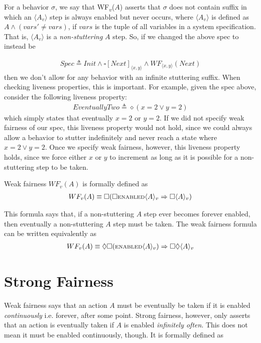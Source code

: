 \documentclass[11pt, oneside]{article}   	%
\begin{document}
For a behavior $\sigma$, we say that WF\textsubscript{$v$}($A$) asserts that $\sigma$ does not contain suffix in which an $\langle A_v \rangle$ step is always enabled but never occurs, where $\langle A_v \rangle$ is defined as $A \wedge (vars' \neq vars)$, if $vars$ is the tuple of all variables in a system specification. That is, $\langle A_v \rangle$ is a \textit{non-stuttering} $A$ step. So, if we changed the above spec to instead be 

\begin{align*}
Spec \triangleq  Init \wedge \square[Next]_{\langle x, y \rangle} \wedge WF_{\langle x, y \rangle}(Next)
\end{align*}
then we don't allow for any behavior with an infinite stuttering suffix. When checking liveness properties, this is important. For example, given the spec above, consider the following  liveness property:
\begin{align*}
EventuallyTwo \triangleq \diamond (x=2 \vee y=2)
\end{align*}
which simply states that eventually $x=2$ or $y=2$. If we did not specify weak fairness of our spec, this liveness property would not hold, since we could always allow a behavior to stutter indefinitely and never reach a state where $x=2 \vee y=2$. Once we specify weak fairness, however, this liveness property holds, since we force either $x$ or $y$ to increment as long as it is possible for a non-stuttering step to be taken.

Weak fairness $WF_v(A)$ is formally defined as 
\begin{align*}
WF_v(A) \equiv \square (\square \text{\scriptsize ENABLED} \langle A \rangle _v \Rightarrow \square \langle A \rangle _v)
\end{align*}

This formula says that, if a non-stuttering $A$ step ever becomes forever enabled, then eventually a non-stuttering $A$ step must be taken. The weak fairness formula can be written equivalently as
\begin{align*}
WF_v(A) \equiv 
\Diamond \square (\text{\scriptsize ENABLED} \langle A \rangle _v) \Rightarrow \square \Diamond \langle A \rangle _v
\end{align*}

\section*{Strong Fairness}

Weak fairness says that an action $A$ must be eventually be taken if it is enabled \textit{continuously} i.e. forever, after some point. Strong fairness, however, only asserts that an action is eventually taken if $A$ is enabled \textit{infinitely often}. This does not mean it must be enabled continuously, though. It is formally defined as
\end{document}
